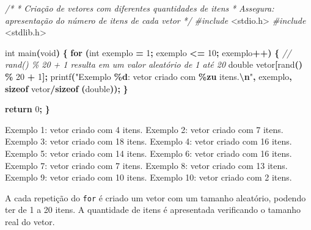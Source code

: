 \documentclass[
  11pt,
  a4paper,
]{scrbook}
\newenvironment{Shaded}{\begin{snugshade}}{\end{snugshade}}
\newcommand{\CommentTok}[1]{\textcolor[rgb]{0.56,0.35,0.01}{\textit{#1}}}
\newcommand{\ControlFlowTok}[1]{\textcolor[rgb]{0.13,0.29,0.53}{\textbf{#1}}}
\newcommand{\DataTypeTok}[1]{\textcolor[rgb]{0.13,0.29,0.53}{#1}}
\newcommand{\DecValTok}[1]{\textcolor[rgb]{0.00,0.00,0.81}{#1}}
\newcommand{\ImportTok}[1]{#1}
\newcommand{\KeywordTok}[1]{\textcolor[rgb]{0.13,0.29,0.53}{\textbf{#1}}}
\newcommand{\NormalTok}[1]{#1}
\newcommand{\OperatorTok}[1]{\textcolor[rgb]{0.81,0.36,0.00}{\textbf{#1}}}
\newcommand{\PreprocessorTok}[1]{\textcolor[rgb]{0.56,0.35,0.01}{\textit{#1}}}
\newcommand{\SpecialCharTok}[1]{\textcolor[rgb]{0.81,0.36,0.00}{\textbf{#1}}}
\newcommand{\StringTok}[1]{\textcolor[rgb]{0.31,0.60,0.02}{#1}}
\begin{document}
\begin{Shaded}
\begin{Highlighting}[]
\CommentTok{/*}
\CommentTok{ * Criação de vetores com diferentes quantidades de itens}
\CommentTok{ * Assegura: apresentação do número de itens de cada vetor}
\CommentTok{ */}
\PreprocessorTok{\#include }\ImportTok{\textless{}stdio.h\textgreater{}}
\PreprocessorTok{\#include }\ImportTok{\textless{}stdlib.h\textgreater{}}

\DataTypeTok{int}\NormalTok{ main}\OperatorTok{(}\DataTypeTok{void}\OperatorTok{)} \OperatorTok{\{}
    \ControlFlowTok{for} \OperatorTok{(}\DataTypeTok{int}\NormalTok{ exemplo }\OperatorTok{=} \DecValTok{1}\OperatorTok{;}\NormalTok{ exemplo }\OperatorTok{\textless{}=} \DecValTok{10}\OperatorTok{;}\NormalTok{ exemplo}\OperatorTok{++)} \OperatorTok{\{}
        \CommentTok{// rand() \% 20 + 1 resulta em um valor aleatório de 1 até 20}
        \DataTypeTok{double}\NormalTok{ vetor}\OperatorTok{[}\NormalTok{rand}\OperatorTok{()} \OperatorTok{\%} \DecValTok{20} \OperatorTok{+} \DecValTok{1}\OperatorTok{];}
\NormalTok{        printf}\OperatorTok{(}\StringTok{"Exemplo }\SpecialCharTok{\%d}\StringTok{: vetor criado com }\SpecialCharTok{\%zu}\StringTok{ itens.}\SpecialCharTok{\textbackslash{}n}\StringTok{"}\OperatorTok{,}\NormalTok{ exemplo}\OperatorTok{,}
               \KeywordTok{sizeof}\NormalTok{ vetor}\OperatorTok{/}\KeywordTok{sizeof} \OperatorTok{(}\DataTypeTok{double}\OperatorTok{));}
    \OperatorTok{\}}

    \ControlFlowTok{return} \DecValTok{0}\OperatorTok{;}
\OperatorTok{\}}
\end{Highlighting}
\end{Shaded}

\begin{Shaded}
\begin{Highlighting}[]
\NormalTok{Exemplo 1: vetor criado com 4 itens.}
\NormalTok{Exemplo 2: vetor criado com 7 itens.}
\NormalTok{Exemplo 3: vetor criado com 18 itens.}
\NormalTok{Exemplo 4: vetor criado com 16 itens.}
\NormalTok{Exemplo 5: vetor criado com 14 itens.}
\NormalTok{Exemplo 6: vetor criado com 16 itens.}
\NormalTok{Exemplo 7: vetor criado com 7 itens.}
\NormalTok{Exemplo 8: vetor criado com 13 itens.}
\NormalTok{Exemplo 9: vetor criado com 10 itens.}
\NormalTok{Exemplo 10: vetor criado com 2 itens.}
\end{Highlighting}
\end{Shaded}

A cada repetição do \texttt{for} é criado um vetor com um tamanho
aleatório, podendo ter de 1 a 20 itens. A quantidade de itens é
apresentada verificando o tamanho real do vetor.
\end{document}
